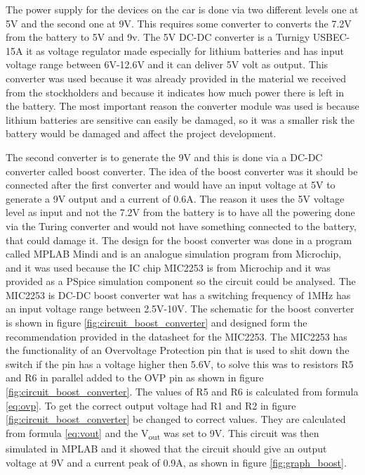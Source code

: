 \documentclass[11pt, titlepage]{article} %
\begin{document}
The power supply for the devices on the car is done via two different levels one at 5V and the second one at 9V. This requires some converter to converts the 7.2V from the battery to 5V and 9v. The 5V DC-DC converter is a Turnigy USBEC-15A it as voltage regulator made especially for lithium batteries and has input voltage range between 6V-12.6V and it can deliver 5V volt as output. This converter was used because it was already provided in the material we received from the stockholders and because it indicates how much power there is left in the battery. The most important reason the converter module was used is because lithium batteries are sensitive can easily be damaged, so it was a smaller risk the battery would be damaged and affect the project development. 

The second converter is to generate the 9V and this is done via a DC-DC converter called boost converter. The idea of the boost converter was it should be connected after the first converter and would have an input voltage at 5V to generate a 9V output and a current of 0.6A. The reason it uses the 5V voltage level as input and not the 7.2V from the battery is to have all the powering done via the Turing converter and would not have something connected to the battery, that could damage it. The design for the boost converter was done in a program called MPLAB Mindi and is an analogue simulation program from Microchip, and it was used because the IC chip MIC2253 is from Microchip and it was provided as a PSpice simulation component so the circuit could be analysed. The MIC2253 is DC-DC boost converter wat has a switching frequency of 1MHz has an input voltage range between 2.5V-10V. The schematic for the boost converter is shown in figure \ref{fig:circuit_boost_converter} and designed form the recommendation provided in the datasheet for the MIC2253. The MIC2253 has the functionality of an Overvoltage Protection pin that is used to shit down the switch if the pin has a voltage higher then 5.6V, to solve this was to resistors R5 and R6 in parallel added to the OVP pin as shown in figure \ref{fig:circuit_boost_converter}. The values of R5 and R6 is calculated from formula \ref{eq:ovp}. To get the correct output voltage had R1 and R2 in figure \ref{fig:circuit_boost_converter} be changed to correct values. They are calculated from formula \ref{eq:vout} and the V\textsubscript{out} was set to 9V. This circuit was then simulated in MPLAB and it showed that the circuit should give an output voltage at 9V and a current peak of 0.9A, as shown in figure \ref{fig:graph_boost}. 
\end{document}
